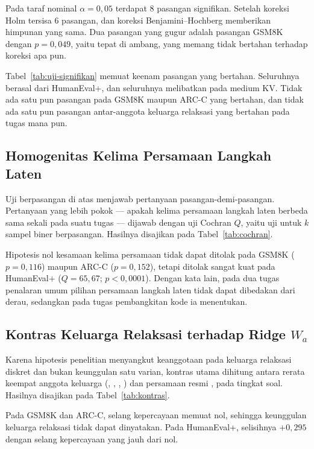 Pada taraf nominal $\alpha = 0{,}05$ terdapat 8 pasangan signifikan. Setelah
koreksi Holm tersisa 6 pasangan, dan koreksi Benjamini--Hochberg memberikan
himpunan yang sama. Dua pasangan yang gugur adalah pasangan GSM8K dengan
$p = 0{,}049$, yaitu tepat di ambang, yang memang tidak bertahan terhadap
koreksi apa pun.



Tabel~\ref{tab:uji-signifikan} memuat keenam pasangan yang bertahan. Seluruhnya
berasal dari HumanEval+, dan seluruhnya melibatkan  pada medium KV.
Tidak ada satu pun pasangan pada GSM8K maupun ARC-C yang bertahan, dan tidak
ada satu pun pasangan antar-anggota keluarga relaksasi yang bertahan pada tugas
mana pun.

\subsection{Homogenitas Kelima Persamaan Langkah Laten}

Uji berpasangan di atas menjawab pertanyaan pasangan-demi-pasangan. Pertanyaan
yang lebih pokok --- apakah kelima persamaan langkah laten berbeda sama sekali
pada suatu tugas --- dijawab dengan uji Cochran $Q$, yaitu uji untuk $k$ sampel
biner berpasangan. Hasilnya disajikan pada Tabel~\ref{tab:cochran}.



Hipotesis nol kesamaan kelima persamaan tidak dapat ditolak pada GSM8K
($p = 0{,}116$) maupun ARC-C ($p = 0{,}152$), tetapi ditolak sangat kuat pada
HumanEval+ ($Q = 65{,}67$; $p < 0{,}0001$). Dengan kata lain, pada dua tugas
penalaran umum pilihan persamaan langkah laten tidak dapat dibedakan dari
derau, sedangkan pada tugas pembangkitan kode ia menentukan.

\subsection{Kontras Keluarga Relaksasi terhadap Ridge $W_a$}

Karena hipotesis penelitian menyangkut keanggotaan pada keluarga relaksasi
diskret dan bukan keunggulan satu varian, kontras utama dihitung antara rerata
keempat anggota keluarga (, , ,
) dan persamaan resmi , pada tingkat soal. Hasilnya
disajikan pada Tabel~\ref{tab:kontras}.



Pada GSM8K dan ARC-C, selang kepercayaan memuat nol, sehingga keunggulan
keluarga relaksasi tidak dapat dinyatakan. Pada HumanEval+, selisihnya
$+0{,}295$ dengan selang kepercayaan yang jauh dari nol.

